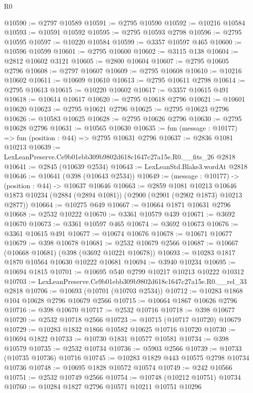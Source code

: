 \begin{lexlean}{R0}
\begin{coremodule}
@10590 := @2797 @10589
@10591 := @2795 @10590
@10592 := @10216 @10584
@10593 := @10591 @10592
@10595 := @2795 @10593 @2798
@10596 := @2795 @10595
@10597 := @10220 @10584
@10599 := @3357 @10597 @465
@10600 := @10596 @10599
@10601 := @2795 @10600
@10602 := @3115 @138
@10604 := @2812 @10602 @3121
@10605 := @2800 @10604
@10607 := @2795 @10605 @2796
@10608 := @2797 @10607
@10609 := @2795 @10608
@10610 := @10216 @10602
@10611 := @10609 @10610
@10613 := @2795 @10611 @2798
@10614 := @2795 @10613
@10615 := @10220 @10602
@10617 := @3357 @10615 @491
@10618 := @10614 @10617
@10620 := @2795 @10618 @2796
@10621 := @10601 @10620
@10623 := @2795 @10621 @2796
@10625 := @2795 @10623 @2796
@10626 := @10583 @10625
@10628 := @2795 @10626 @2796
@10630 := @2795 @10628 @2796
@10631 := @10565 @10630
@10635 := fun (message : @10177) => fun (position : @44) => @2795 @10631 @2796
@10637 := @2836 @1081 @10213
@10639 := LexLeanPreserve.Ce9b01ebb309b9802d618c1647c27a15e.R0.__fits_26 @2818
@10641 := @2845 (@10639 @2534)
@10643 := LexLeanStd.Blake3.wordAt @2818
@10646 := @10641 (@398 (@10643 @2534))
@10649 := (message : @10177) -> (position : @44) -> @10637 @10646
@10663 := @2859
    @1081
    @10213
    @10646
    @1873
    @10234
    (@2884 (@2894 @1081))
    (@2900 (@2901 (@2902 @1873) @10213 @2877))
@10664 := @10275 @649
@10667 := @10664 @1871 @10631 @2796
@10668 := @2532 @10222
@10670 := @3361 @10579 @439
@10671 := @3692 @10670
@10673 := @3361 @10597 @465
@10674 := @3692 @10673
@10676 := @3361 @10615 @491
@10677 := @10674 @10676
@10678 := @10671 @10677
@10679 := @398 @10678
@10681 := @2532 @10679 @2566
@10687 := @10667 (@10668 @10681) (@398 (@3692 @10221 @10678))
@10693 := @10283 @1817 @1870 @10564 @10630 @10222 @10681
@10694 := @3940 @10234
@10695 := @10694 @1815
@10701 := @10695 @540 @2799 @10217 @10213 @10222 @10312
@10703 := LexLeanPreserve.Ce9b01ebb309b9802d618c1647c27a15e.R0.__rel_33 @2818
@10706 := @10693 (@10701 (@10703 @2534))
@10712 := @10283 @1868 @104 @10628 @2796 @10679 @2566
@10715 := @10664 @1867 @10626 @2796
@10716 := @398 @10670
@10717 := @2532 @10716
@10718 := @398 @10677
@10720 := @2532 @10718 @2566
@10723 := @10715 (@10717 @10720) @10679
@10729 := @10283 @1832 @1866 @10582 @10625 @10716 @10720
@10730 := @10694 @1822
@10733 := @10730 @1831 @10577 @10581
@10734 := @398 @10579
@10735 := @2532 @10734
@10736 := @5903 @2566
@10739 := @10733 (@10735 @10736) @10716
@10745 := @10283 @1829 @443 @10575 @2798 @10734 @10736
@10748 := @10695 @1828 @10572 @10574
@10749 := @242 @10566
@10751 := @2532 @10749 @2566
@10754 := @10748 (@10212 @10751) @10734
@10760 := @10284 @1827 @2796 @10571 @10211 @10751 @10296

\end{coremodule}
\end{lexlean}
